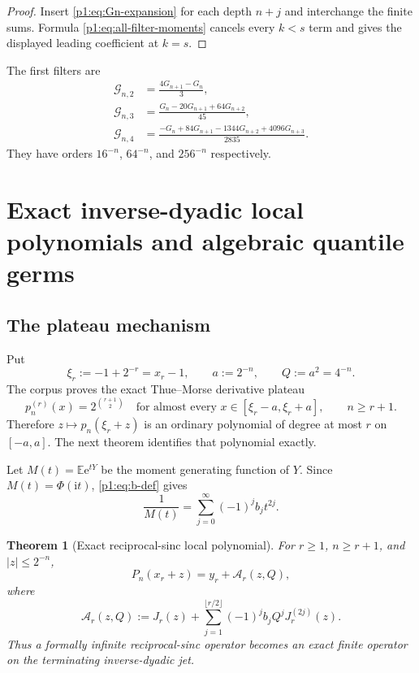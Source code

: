 \documentclass[11pt,oneside]{article}
\numberwithin{equation}{section}
\newtheorem{theorem}{Theorem}[section]
\theoremstyle{definition}
\theoremstyle{remark}
\newcommand{\E}{\mathbb E}
\newcommand{\e}{\mathrm e}
\newcommand{\ii}{\mathrm i}
\newcommand{\Fn}{P_n}
\begin{document}
\begin{proof}
Insert \eqref{p1:eq:Gn-expansion} for each depth $n+j$ and interchange the finite
sums.  Formula \eqref{p1:eq:all-filter-moments} cancels every $k<s$ term and gives
the displayed leading coefficient at $k=s$.
\end{proof}

The first filters are
\begin{align}
 \mathcal G_{n,2}&=\frac{4G_{n+1}-G_n}{3},
 \label{p1:eq:R2-filter}\\
 \mathcal G_{n,3}&=\frac{G_n-20G_{n+1}+64G_{n+2}}{45},
 \label{p1:eq:R3-filter}\\
 \mathcal G_{n,4}&=
 \frac{-G_n+84G_{n+1}-1344G_{n+2}+4096G_{n+3}}{2835}.
 \label{p1:eq:R4-filter}
\end{align}
They have orders $16^{-n}$, $64^{-n}$, and $256^{-n}$ respectively.

\section{Exact inverse-dyadic local polynomials and algebraic quantile germs}
\label{p1:sec:exact-local}

\subsection{The plateau mechanism}

Put
\begin{equation}
 \xi_r:=-1+2^{-r}=x_r-1,
 \qquad a:=2^{-n},\qquad Q:=a^2=4^{-n}.
 \label{p1:eq:xi-a-Q}
\end{equation}
The corpus proves the exact Thue--Morse derivative plateau
\begin{equation}
 p_n^{(r)}(x)=2^{\binom{r+1}{2}}
 \quad\text{for almost every }x\in[\xi_r-a,\xi_r+a],
 \qquad n\ge r+1.
 \label{p1:eq:plateau-imported}
\end{equation}
Therefore $z\mapsto p_n(\xi_r+z)$ is an ordinary polynomial of degree at most
$r$ on $[-a,a]$.  The next theorem identifies that polynomial exactly.

Let $M(t)=\E\e^{tY}$ be the moment generating function of $Y$.  Since
$M(t)=\Phi(\ii t)$, \eqref{p1:eq:b-def} gives
\begin{equation}
 \frac1{M(t)}=\sum_{j=0}^{\infty}(-1)^jb_jt^{2j}.
 \label{p1:eq:reciprocal-MGF}
\end{equation}

\begin{theorem}[Exact reciprocal-sinc local polynomial]
\label{p1:thm:exact-local-polynomial}
For $r\ge1$, $n\ge r+1$, and $|z|\le2^{-n}$,
\begin{equation}
 \boxed{
 \Fn(x_r+z)=y_r+\mathcal A_r(z,Q),}
 \label{p1:eq:exact-local-Pn}
\end{equation}
where
\begin{equation}
 \boxed{
 \mathcal A_r(z,Q):=
 J_r(z)+\sum_{j=1}^{\lfloor r/2\rfloor}
 (-1)^jb_jQ^jJ_r^{(2j)}(z).}
 \label{p1:eq:Ar-def}
\end{equation}
Thus a formally infinite reciprocal-sinc operator becomes an exact finite operator on the
terminating inverse-dyadic jet.
\end{theorem}
\end{document}
